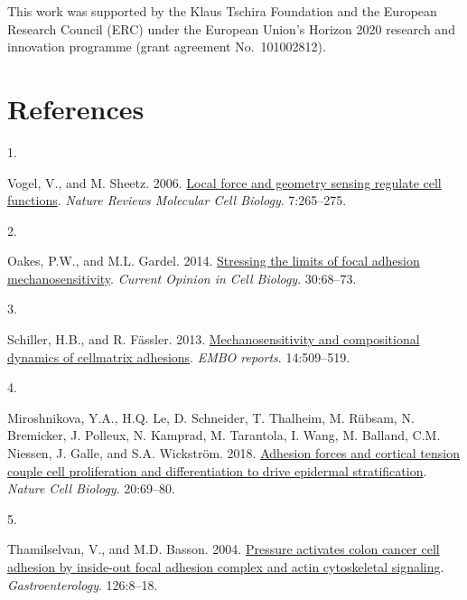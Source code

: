 \documentclass[
  twocolumn]{biophys-new-mod}
\newlength{\cslhangindent}
\newlength{\csllabelwidth}
\newlength{\cslentryspacingunit} %
\newenvironment{CSLReferences}[2] %
 {%
  \setlength{\parindent}{0pt}
  \ifodd #1
  \let\oldpar\par
  \def\par{\hangindent=\cslhangindent\oldpar}
  \fi
  \setlength{\parskip}{#2\cslentryspacingunit}
 }%
 {}
\newcommand{\CSLLeftMargin}[1]{\parbox[t]{\csllabelwidth}{#1}}
\newcommand{\CSLRightInline}[1]{\parbox[t]{\linewidth - \csllabelwidth}{#1}\break}
\begin{document}
This work was supported by the Klaus Tschira Foundation and the European
Research Council (ERC) under the European Union's Horizon 2020 research
and innovation programme (grant agreement No.~101002812).

\hypertarget{references}{%
\section{References}\label{references}}

\hypertarget{refs}{}
\begin{CSLReferences}{0}{0}
\leavevmode{}%
\CSLLeftMargin{1. }%
\CSLRightInline{Vogel, V., and M. Sheetz. 2006.
\href{https://doi.org/10.1038/nrm1890}{Local force and geometry sensing
regulate cell functions}. \emph{Nature Reviews Molecular Cell Biology}.
7:265--275.}

\leavevmode{}%
\CSLLeftMargin{2. }%
\CSLRightInline{Oakes, P.W., and M.L. Gardel. 2014.
\href{https://doi.org/10.1016/j.ceb.2014.06.003}{Stressing the limits of
focal adhesion mechanosensitivity}. \emph{Current Opinion in Cell
Biology}. 30:68--73.}

\leavevmode{}%
\CSLLeftMargin{3. }%
\CSLRightInline{Schiller, H.B., and R. Fässler. 2013.
\href{https://doi.org/10.1038/embor.2013.49}{Mechanosensitivity and
compositional dynamics of cell\textendash matrix adhesions}. \emph{EMBO
reports}. 14:509--519.}

\leavevmode{}%
\CSLLeftMargin{4. }%
\CSLRightInline{Miroshnikova, Y.A., H.Q. Le, D. Schneider, T. Thalheim,
M. Rübsam, N. Bremicker, J. Polleux, N. Kamprad, M. Tarantola, I. Wang,
M. Balland, C.M. Niessen, J. Galle, and S.A. Wickström. 2018.
\href{https://doi.org/10.1038/s41556-017-0005-z}{Adhesion forces and
cortical tension couple cell proliferation and differentiation to drive
epidermal stratification}. \emph{Nature Cell Biology}. 20:69--80.}

\leavevmode{}%
\CSLLeftMargin{5. }%
\CSLRightInline{Thamilselvan, V., and M.D. Basson. 2004.
\href{https://doi.org/10.1053/j.gastro.2003.10.078}{Pressure activates
colon cancer cell adhesion by inside-out focal adhesion complex and
actin cytoskeletal signaling}. \emph{Gastroenterology}. 126:8--18.}


\end{CSLReferences}
\end{document}
